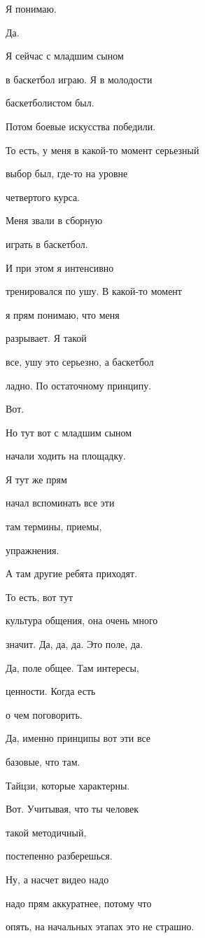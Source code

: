 Я понимаю.

Да.

Я сейчас с младшим сыном

в баскетбол играю. Я в молодости

баскетболистом был.

Потом боевые искусства победили.

То есть, у меня в какой-то момент серьезный

выбор был, где-то на уровне

четвертого курса.

Меня звали в сборную

играть в баскетбол.

И при этом я интенсивно

тренировался по ушу. В какой-то момент

я прям понимаю, что меня

разрывает. Я такой

все, ушу это серьезно, а баскетбол

ладно. По остаточному принципу.

Вот.

Но тут вот с младшим сыном

начали ходить на площадку.

Я тут же прям

начал вспоминать все эти

там термины, приемы,

упражнения.

А там другие ребята приходят.

То есть, вот тут

культура общения, она очень много

значит. Да, да, да. Это поле, да.

Да, поле общее. Там интересы,

ценности. Когда есть

о чем поговорить.

Да, именно принципы вот эти все

базовые, что там.

Тайцзи, которые характерны.

Вот. Учитывая, что ты человек

такой методичный,

постепенно разберешься.

Ну, а насчет видео надо

надо прям аккуратнее, потому что

опять, на начальных этапах это не страшно.

